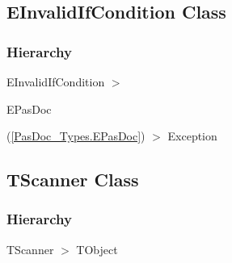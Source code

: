 \documentclass{report}
\newif\ifpdf
\begin{document}
\subsection*{EInvalidIfCondition Class}
\fi
\label{PasDoc_Scanner.EInvalidIfCondition}
\subsubsection*{\large{\textbf{Hierarchy}}\normalsize\hspace{1ex}\hfill}
EInvalidIfCondition {$>$} \begin{ttfamily}EPasDoc\end{ttfamily}(\ref{PasDoc_Types.EPasDoc}) {$>$} 
Exception
\ifpdf
\subsection*{\large{\textbf{TScanner Class}}\normalsize\hspace{1ex}\hrulefill}
\else
\subsection*{TScanner Class}
\fi
\label{PasDoc_Scanner.TScanner}
\subsubsection*{\large{\textbf{Hierarchy}}\normalsize\hspace{1ex}\hfill}
TScanner {$>$} TObject
\end{document}
